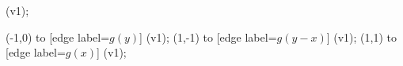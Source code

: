 \begin{feynhand}
	\vertex (v1);		

	\propag[glu] (-1,0) to [edge label=$g(y)$] (v1);
	\propag[glu] (1,-1) to [edge label=$g(y-x)$] (v1);
	\propag[glu] (1,1) to [edge label=$g(x)$] (v1);
\end{feynhand}
